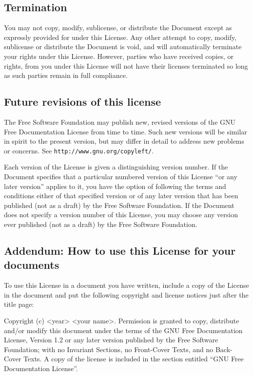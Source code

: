 \subsection{Termination}

You may not copy, modify, sublicense, or distribute the Document except
as expressly provided for under this License. Any other attempt to
copy, modify, sublicense or distribute the Document is void, and will
automatically terminate your rights under this License. However, parties
who have received copies, or rights, from you under this License will
not have their licenses terminated so long as such parties remain
in full compliance.


\subsection{Future revisions of this license}

The Free Software Foundation may publish new, revised versions of
the GNU Free Documentation License from time to time. Such new versions
will be similar in spirit to the present version, but may differ in
detail to address new problems or concerns. See \texttt{\small http://www.gnu.org/copyleft/}.

Each version of the License is given a distinguishing version number.
If the Document specifies that a particular numbered version of this
License ``or any later version'' applies to it, you have the option
of following the terms and conditions either of that specified version
or of any later version that has been published (not as a draft) by
the Free Software Foundation. If the Document does not specify a version
number of this License, you may choose any version ever published
(not as a draft) by the Free Software Foundation.


\subsection{Addendum: How to use this License for your documents}

To use this License in a document you have written, include a copy
of the License in the document and put the following copyright and
license notices just after the title page:

Copyright (c) <year> <your name>. Permission is granted to copy, distribute
and/or modify this document under the terms of the GNU Free Documentation
License, Version 1.2 or any later version published by the Free Software
Foundation; with no Invariant Sections, no Front-Cover Texts, and
no Back-Cover Texts. A copy of the license is included in the section
entitled ``GNU Free Documentation License''.

